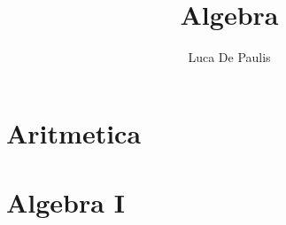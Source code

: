\documentclass[italian,oneside,headinclude,10pt]{scrbook}
\begin{document}
\author{Luca De Paulis}
\title{Algebra}
\maketitle

\tableofcontents
\part{Aritmetica}
% 
% 
% 
% 
% 

% 








% 
% 
% 
% 
% 

\part{Algebra I}


\end{document}
